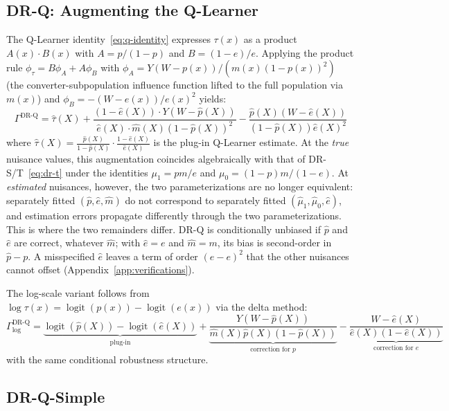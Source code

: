 \documentclass{article}
\newcommand{\logit}{\operatorname{logit}}
\begin{document}
\subsection{DR-Q: Augmenting the Q-Learner}
\label{sec:dr-q}

The Q-Learner identity~\eqref{eq:q-identity} expresses $\tau(x)$ as a
product $A(x) \cdot B(x)$ with $A = p/(1-p)$ and $B = (1-e)/e$.
Applying the product rule $\phi_\tau = B\phi_A + A\phi_B$ with
$\phi_A = Y(W-p(x))/(m(x)(1-p(x))^2)$ (the converter-subpopulation
influence function lifted to the full population via $m(x)$) and
$\phi_B = -(W-e(x))/e(x)^2$ yields:
\begin{equation}
\label{eq:dr-q}
\Gamma^{\text{DR-Q}} = \hat{\tau}(X) + \frac{(1-\hat{e}(X)) \cdot Y(W-\hat{p}(X))}{\hat{e}(X) \cdot \hat{m}(X)(1-\hat{p}(X))^2} - \frac{\hat{p}(X)(W-\hat{e}(X))}{(1-\hat{p}(X))\hat{e}(X)^2}
\end{equation}
where $\hat{\tau}(X) = \frac{\hat{p}(X)}{1-\hat{p}(X)} \cdot \frac{1-\hat{e}(X)}{\hat{e}(X)}$ is the plug-in Q-Learner estimate.
At the \emph{true} nuisance values, this augmentation coincides
algebraically with that of DR-S/T~\eqref{eq:dr-t} under the identities
$\mu_1 = pm/e$ and $\mu_0 = (1-p)m/(1-e)$. At \emph{estimated}
nuisances, however, the two parameterizations are no longer
equivalent: separately fitted $(\hat{p}, \hat{e}, \hat{m})$ do not
correspond to separately fitted $(\hat{\mu}_1, \hat{\mu}_0, \hat{e})$,
and estimation errors propagate differently through the two
parameterizations. This is where the two remainders differ. DR-Q is
conditionally unbiased if $\hat{p}$ and $\hat{e}$ are correct, whatever
$\hat{m}$; with $\hat{e} = e$ and $\hat{m} = m$, its bias is
second-order in $\hat{p} - p$. A misspecified $\hat{e}$ leaves a term of
order $(\hat{e} - e)^2$ that the other nuisances cannot offset
(Appendix~\ref{app:verifications}).

The log-scale variant follows from
$\log \tau(x) = \logit(p(x)) - \logit(e(x))$ via the delta method:
\begin{equation}
\label{eq:dr-q-log}
\Gamma^{\text{DR-Q}}_{\log} = \underbrace{\logit(\hat{p}(X)) - \logit(\hat{e}(X))}_{\text{plug-in}} + \underbrace{\frac{Y(W-\hat{p}(X))}{\hat{m}(X) \hat{p}(X)(1-\hat{p}(X))}}_{\text{correction for } p} - \underbrace{\frac{W-\hat{e}(X)}{\hat{e}(X)(1-\hat{e}(X))}}_{\text{correction for } e}
\end{equation}
with the same conditional robustness structure.

\subsection{DR-Q-Simple}
\label{sec:dr-q-simple}
\end{document}
